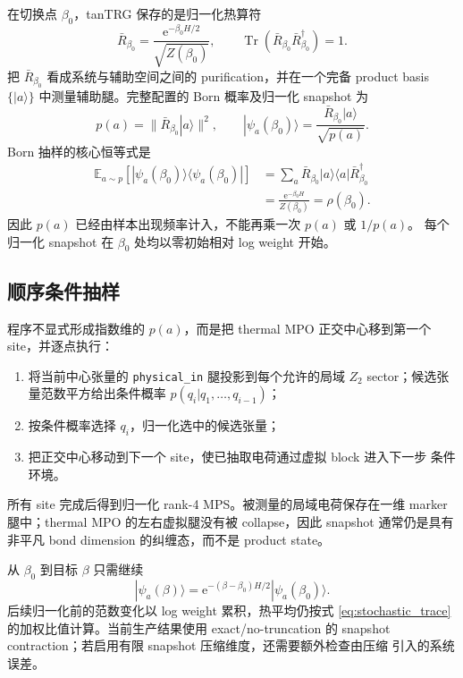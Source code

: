\documentclass[11pt,a4paper,UTF8,fontset=fandol]{ctexart}
\newcommand{\Tr}{\operatorname{Tr}}
\newcommand{\ee}{\mathrm e}
\begin{document}
在切换点 $\beta_0$，tanTRG 保存的是归一化热算符
\begin{equation}
    \bar R_{\beta_0}
    =\frac{\ee^{-\beta_0H/2}}{\sqrt{Z(\beta_0)}} ,
    \qquad
    \Tr\!\left(\bar R_{\beta_0}\bar R_{\beta_0}^{\dagger}\right)=1 .
\end{equation}
把 $\bar R_{\beta_0}$ 看成系统与辅助空间之间的 purification，并在一个完备
product basis $\{|a\rangle\}$ 中测量辅助腿。完整配置的 Born 概率及归一化
snapshot 为
\begin{equation}
    p(a)=\|\bar R_{\beta_0}|a\rangle\|^2,
    \qquad
    |\psi_a(\beta_0)\rangle
    =\frac{\bar R_{\beta_0}|a\rangle}{\sqrt{p(a)}} .
    \label{eq:born_snapshot}
\end{equation}
Born 抽样的核心恒等式是
\begin{align}
    \mathbb E_{a\sim p}
    [|\psi_a(\beta_0)\rangle\langle\psi_a(\beta_0)|]
    &=\sum_a \bar R_{\beta_0}|a\rangle
      \langle a|\bar R_{\beta_0}^{\dagger} \\
    &=\frac{\ee^{-\beta_0H}}{Z(\beta_0)}
    =\rho(\beta_0).
    \label{eq:density_reconstruction}
\end{align}
因此 $p(a)$ 已经由样本出现频率计入，不能再乘一次 $p(a)$ 或 $1/p(a)$。
每个归一化 snapshot 在 $\beta_0$ 处均以零初始相对 log weight 开始。

\subsection{顺序条件抽样}

程序不显式形成指数维的 $p(a)$，而是把 thermal MPO 正交中心移到第一个
site，并逐点执行：
\begin{enumerate}
    \item 将当前中心张量的 \texttt{physical\_in} 腿投影到每个允许的局域
    $Z_2$ sector；候选张量范数平方给出条件概率 $p(q_i|q_1,\ldots,q_{i-1})$；
    \item 按条件概率选择 $q_i$，归一化选中的候选张量；
    \item 把正交中心移动到下一个 site，使已抽取电荷通过虚拟 block 进入下一步
    条件环境。
\end{enumerate}
所有 site 完成后得到归一化 rank-4 MPS。被测量的局域电荷保存在一维
marker 腿中；thermal MPO 的左右虚拟腿没有被 collapse，因此 snapshot
通常仍是具有非平凡 bond dimension 的纠缠态，而不是 product state。

从 $\beta_0$ 到目标 $\beta$ 只需继续
\begin{equation}
    |\psi_a(\beta)\rangle
    =\ee^{-(\beta-\beta_0)H/2}|\psi_a(\beta_0)\rangle .
\end{equation}
后续归一化前的范数变化以 log weight 累积，热平均仍按式
\eqref{eq:stochastic_trace} 的加权比值计算。当前生产结果使用 exact/no-truncation
的 snapshot contraction；若启用有限 snapshot 压缩维度，还需要额外检查由压缩
引入的系统误差。
\end{document}
